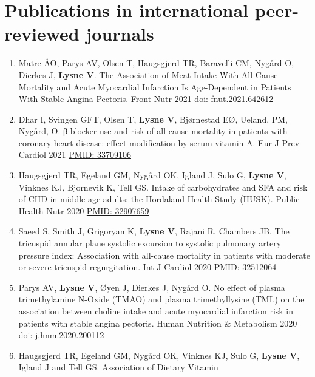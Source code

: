 \documentclass[11pt, a4paper]{awesome-cv}
\providecommand{\tightlist}{%
	\setlength{\itemsep}{0pt}\setlength{\parskip}{0pt}}
\begin{document}
\hypertarget{publications-in-international-peer-reviewed-journals}{%
\section{Publications in international peer-reviewed
journals}\label{publications-in-international-peer-reviewed-journals}}

\begin{enumerate}
\def\labelenumi{\arabic{enumi}.}
\tightlist
\item
  Matre ÅO, Parys AV, Olsen T, Haugsgjerd TR, Baravelli CM, Nygård O,
  Dierkes J, \textbf{Lysne V}. The Association of Meat Intake With
  All-Cause Mortality and Acute Myocardial Infarction Is Age-Dependent
  in Patients With Stable Angina Pectoris. Front Nutr 2021
  \href{https://www.frontiersin.org/articles/10.3389/fnut.2021.642612/full}{doi:
  fnut.2021.642612}
\item
  Dhar I, Svingen GFT, Olsen T, \textbf{Lysne V}, Bjørnestad EØ, Ueland,
  PM, Nygård, O. β-blocker use and risk of all-cause mortality in
  patients with coronary heart disease: effect modification by serum
  vitamin A. Eur J Prev Cardiol 2021
  \href{https://pubmed.ncbi.nlm.nih.gov/33709106/}{PMID: 33709106}
\item
  Haugsgjerd TR, Egeland GM, Nygård OK, Igland J, Sulo G, \textbf{Lysne
  V}, Vinknes KJ, Bjornevik K, Tell GS. Intake of carbohydrates and SFA
  and risk of CHD in middle-age adults: the Hordaland Health Study
  (HUSK). Public Health Nutr 2020
  \href{https://pubmed.ncbi.nlm.nih.gov/32907659/}{PMID: 32907659}
\item
  Saeed S, Smith J, Grigoryan K, \textbf{Lysne V}, Rajani R, Chambers
  JB. The tricuspid annular plane systolic excursion to systolic
  pulmonary artery pressure index: Association with all-cause mortality
  in patients with moderate or severe tricuspid regurgitation. Int J
  Cardiol 2020 \href{https://pubmed.ncbi.nlm.nih.gov/32512064/}{PMID:
  32512064}
\item
  Parys AV, \textbf{Lysne V}, Øyen J, Dierkes J, Nygård O. No effect of
  plasma trimethylamine N-Oxide (TMAO) and plasma trimethyllysine (TML)
  on the association between choline intake and acute myocardial
  infarction risk in patients with stable angina pectoris. Human
  Nutrition \& Metabolism 2020
  \href{https://www.sciencedirect.com/science/article/pii/S2666149720300025}{doi:
  j.hnm.2020.200112}
\item
  Haugsgjerd TR, Egeland GM, Nygård OK, Vinknes KJ, Sulo G,
  \textbf{Lysne V}, Igland J and Tell GS. Association of Dietary Vitamin

\end{enumerate}
\end{document}
